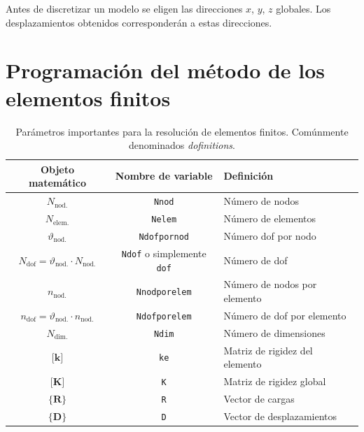\documentclass[11pt, a4paper,titlepage]{article}
\newcommand{\Mme}[1]{\boldsymbol{[}\mathbf{#1} \boldsymbol{]}}
\newcommand{\Cme}[1]{\boldsymbol{\{ }\mathbf{#1} \boldsymbol{\}} }
\newcommand{\CD}{\Cme{D}}
\newcommand{\MK}{\Mme{K}}
\newcommand{\Mk}{\Mme{k}}
\newcommand{\CRext}{\Cme{R^{\mathrm{ext.}}}}
\newcommand{\CR}{\Cme{R}}
\begin{document}
Antes de discretizar un modelo se eligen las direcciones $x$, $y$, $z$ globales. Los desplazamientos obtenidos corresponderán a estas direcciones.

\part{Programación del método de los elementos finitos}

\newcommand{\Numberof}{N}
\newcommand{\Numberlocal}{n}
\newcommand{\DOF}{\vartheta}
\newcommand{\Nnod}{\ensuremath{\Numberof_{\mathrm{nod.}}}}
\newcommand{\Ndims}{\ensuremath{\Numberof_{\mathrm{dim.}}}}
\newcommand{\Nelem}{\ensuremath{\Numberof_{\mathrm{elem.}}}}
\newcommand{\Ndofpornod}{\ensuremath{\DOF_{\mathrm{nod.}}}}
\newcommand{\Ndof}{\ensuremath{\Numberof_{\mathrm{dof}}}}

\newcommand{\Nnodporelem}{\ensuremath{\Numberlocal_{\mathrm{nod.}}}}
\newcommand{\Ndofporelem}{\ensuremath{\Numberlocal_{\mathrm{dof}}}}

\begin{table}[htb!]
	\centering
	\begin{tabular}{ccl}
		Objeto matemático & Nombre de variable & Definición \\ \hline
	\Nnod	& \texttt{Nnod}                   &    Número de nodos        \\
	\Nelem	& \texttt{Nelem}                   &    Número de elementos       \\
	\Ndofpornod	& \texttt{Ndofpornod}                   &    Número dof por nodo       \\
	$\Ndof=\Ndofpornod \cdot \Nnod$	& \texttt{Ndof} o simplemente \texttt{dof}                   &    Número de dof        \\
	\Nnodporelem	& \texttt{Nnodporelem}                   &    Número de nodos por elemento     \\
	$\Ndofporelem= \Ndofpornod \cdot \Nnodporelem$	& \texttt{Ndofporelem}                   &    Número de dof por elemento       \\
	\Ndims	& \texttt{Ndim}                   &    Número de dimensiones      \\
	$\Mk$	& \texttt{ke}                   &   Matriz de rigidez del elemento      \\
	$\MK$	& \texttt{K}                   &   Matriz de rigidez global      \\
	$\CR$   & \texttt{R}                  &  Vector de cargas \\
	$\CD$   & \texttt{D}                 & Vector de desplazamientos \\
	\end{tabular}

\caption{Parámetros importantes para la resolución de elementos finitos. Comúnmente denominados \textit{dofinitions}.}
\label{tab:VariableDefinitions}
\end{table}
\end{document}
